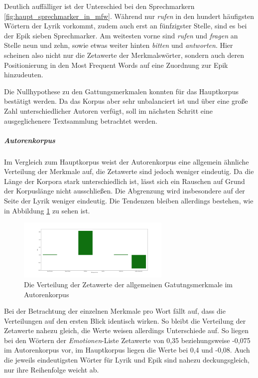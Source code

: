 \documentclass[a4paper,10p]{article}
\begin{document}
Deutlich auffälliger ist der Unterschied bei den Sprechmarkern \ref{fig:haupt_sprechmarker_in_mfw}. Während nur \textit{rufen} in den hundert häufigsten Wörtern der Lyrik vorkommt, zudem auch erst an fünfzigster Stelle, sind es bei der Epik sieben Sprechmarker. Am weitesten vorne sind \textit{rufen} und \textit{fragen} an Stelle neun und zehn, sowie etwas weiter hinten \textit{bitten} und \textit{antworten}. Hier scheinen also nicht nur die Zetawerte der Merkmalswörter, sondern auch deren Positionierung in den Most Frequent Words auf eine Zuordnung zur Epik hinzudeuten. 

Die Nullhypothese zu den Gattungsmerkmalen konnten für das Hauptkorpus bestätigt werden. Da das Korpus aber sehr unbalanciert ist und über eine große Zahl unterschiedlicher Autoren verfügt, soll im nächsten Schritt eine ausgeglichenere Textsammlung betrachtet werden.

\subparagraph{Autorenkorpus} \quad \par 

Im Vergleich zum Hauptkorpus  weist der Autorenkorpus eine allgemein ähn\-lich\-e Verteilung der Merkmale auf, die  Zetawerte sind jedoch weniger eindeutig. Da die Länge der Korpora stark unterschiedlich ist, lässt sich ein Rauschen auf Grund der Korpuslänge nicht ausschließen. Die Abgrenzung wird insbesondere auf der Seite der Lyrik weniger eindeutig. Die Tendenzen bleiben allerdings bestehen, wie in Abbildung  \ref{fig:autoren_alle_merkmale} zu sehen ist. \par 

\begin{figure}
	\includegraphics[width=0.65\textwidth]{autoren_alle_merkmale.png}
	\caption{Die Verteilung der Zetawerte der allgemeinen Gatutngsmerkmale im Autorenkorpus}
	\label{fig:autoren_alle_merkmale}
\end{figure}

Bei der Betrachtung der einzelnen Merkmale pro Wort fällt auf, dass die Verteilungen auf den ersten Blick identisch wirken. So bleibt die Verteilung der Zetawerte nahezu gleich, die Werte weisen allerdings Unterschiede auf. So liegen bei den Wörtern der \emph{Emotionen}-Liste Zetawerte von 0,35 beziehungsweise -0,075 im Autorenkorpus vor, im Hauptkorpus liegen die Werte bei 0,4 und -0,08. Auch die jeweils eindeutigsten Wörter für Lyrik und Epik sind nahezu deckungsgleich, nur ihre Reihenfolge weicht ab. \par 
\end{document}
